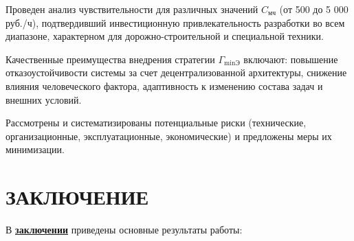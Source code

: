 Проведен анализ чувствительности для различных значений $ C_{\text{мч}} $ (от 500 до 5 000 руб./ч), подтвердивший инвестиционную привлекательность разработки во всем диапазоне, характерном для дорожно-строительной и специальной техники.

Качественные преимущества внедрения стратегии $ \Gamma_{\min\text{Э}} $ включают: повышение отказоустойчивости системы за счет децентрализованной архитектуры, снижение влияния человеческого фактора, адаптивность к изменению состава задач и внешних условий.

Рассмотрены и систематизированы потенциальные риски (технические, организационные, эксплуатационные, экономические) и предложены меры их минимизации.

\section*{\MakeUppercase{Заключение}}
\label{sec:all_result}
В \underline{\textbf{заключении}} приведены основные результаты работы:





\begingroup
\setlength{\bibitemsep}{0pt}%
\setlength{\bibnamesep}{0pt}%
\setlength{\bibinitsep}{0pt}%
\setlength{\bibparsep}{0pt}%
\setlength{\itemsep}{0pt}%
\setlength{\parsep}{0pt}%
\setlength{\topsep}{0pt}%
\setlength{\partopsep}{0pt}%

\renewcommand{\bibsection}{%
    \section*{\bibname}%
    \vspace{-\parskip}%
}

